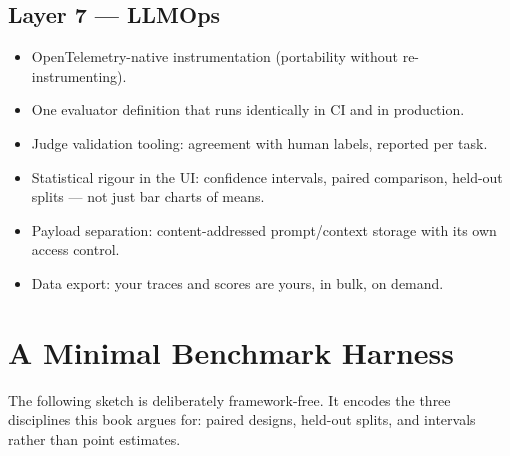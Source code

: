 \documentclass[11pt,twoside,openright]{book}
\theoremstyle{definition}
\theoremstyle{plain}
\theoremstyle{remark}
\begin{document}
\section{Layer 7 --- LLMOps}

\begin{itemize}[leftmargin=1.4em,itemsep=1pt]
  \item OpenTelemetry-native instrumentation (portability without re-instrumenting).
  \item One evaluator definition that runs identically in CI and in production.
  \item Judge validation tooling: agreement with human labels, reported per task.
  \item Statistical rigour in the UI: confidence intervals, paired comparison,
        held-out splits --- not just bar charts of means.
  \item Payload separation: content-addressed prompt/context storage with its own
        access control.
  \item Data export: your traces and scores are yours, in bulk, on demand.
\end{itemize}

\cleardoublepage

\chapter{A Minimal Benchmark Harness}

The following sketch is deliberately framework-free. It encodes the three
disciplines this book argues for: paired designs, held-out splits, and intervals
rather than point estimates.
\end{document}

